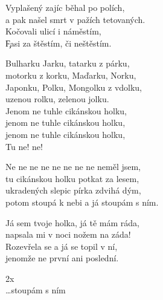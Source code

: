 
\ve{}
Vyplašený zajíc běhal po polích,\\
a pak našel smrt v pažích tetovaných.\\
Kočovali ulicí i náměstím,\\
\c{F}asi za štěstím, či neštěstím. 

\cho{}
Bulharku Jarku, tatarku z párku,\\
motorku z korku, Maďarku, Norku,\\
Japonku, Polku, Mongolku z vdolku,\\
uzenou rolku, zelenou jolku.\\
Jenom ne tuhle cikánskou holku,\\
jenom ne tuhle cikánskou holku,\\
jenom ne tuhle cikánskou holku,\\
Tu ne! ne! 

\re{*:}
Ne ne ne ne ne ne ne ne neměl jsem,\\
tu cikánskou holku potkat za lesem,\\
ukradených slepic pírka zdvihá dým,\\
potom stoupá k nebi a já stoupám s ním. 

\ve{}
Já sem tvoje holka, já tě mám ráda,\\
napsala mi v noci nožem na záda!\\
Rozevřela se a já se topil v ní,\\
jenomže ne první ani poslední.  

\cho{}

\re{*:} 2x\\
\ldots{}stoupám s ním

\esong{}